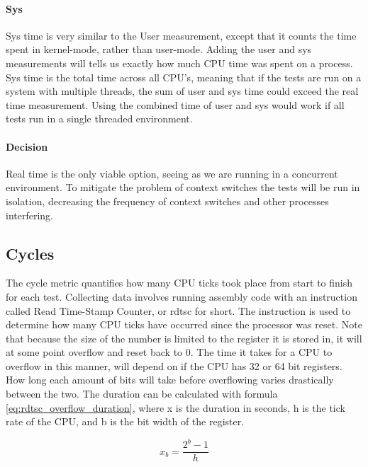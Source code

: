 \paragraph{Sys}
Sys time is very similar to the User measurement, except that it counts the time spent in kernel-mode, rather than user-mode.
Adding the user and sys measurements will tells us exactly how much CPU time was spent on a process.
Sys time is the total time across all CPU's, meaning that if the tests are run on a system with multiple threads, the sum of user and sys time could exceed the real time measurement.
Using the combined time of user and sys would work if all tests run in a single threaded environment.

\paragraph{Decision}
Real time is the only viable option, seeing as we are running in a concurrent environment.
To mitigate the problem of context switches the tests will be run in isolation, decreasing the frequency of context switches and other processes interfering.

\subsection{Cycles}
The cycle metric quantifies how many CPU ticks took place from start to finish for each test.
Collecting data involves running assembly code with an instruction called Read Time-Stamp Counter, or rdtsc for short\cite{stack_overflow_rdtcs}.
The instruction is used to determine how many CPU ticks have occurred since the processor was reset.
Note that because the size of the number is limited to the register it is stored in, it will at some point overflow and reset back to 0.
The time it takes for a CPU to overflow in this manner, will depend on if the CPU has 32 or 64 bit registers.
How long each amount of bits will take before overflowing varies drastically between the two.
The duration can be calculated with formula \ref{eq:rdtsc_overflow_duration}, where x is the duration in seconds, h is the tick rate of the CPU, and b is the bit width of the register.

\begin{equation}\label{eq:rdtsc_overflow_duration}
x_b = \frac{2^b - 1}{h}
\end{equation}

\bigskip


